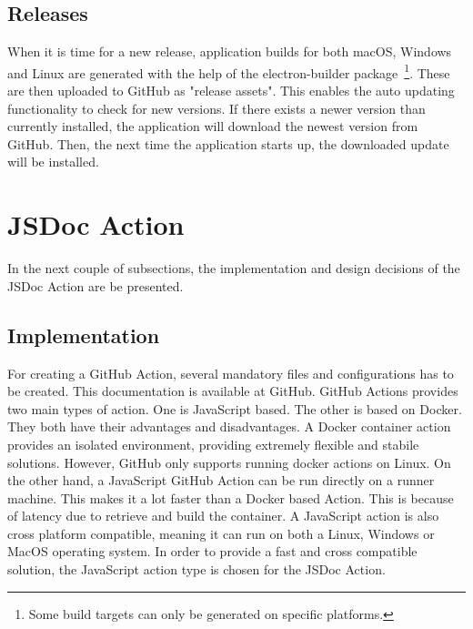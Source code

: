 \subsection{Releases}
When it is time for a new release, application builds for both macOS, Windows and Linux are generated with the help of the electron-builder package~\footnote{Some build targets can only be generated on specific platforms.}. These are then uploaded to GitHub as "release assets".
This enables the auto updating functionality to check for new versions. If there exists a newer version than currently installed, the application will download the newest version from GitHub. Then, the next time the application starts up, the downloaded update will be installed.

\section{JSDoc Action}
In the next couple of subsections, the implementation and design decisions of the JSDoc Action are be presented.
\subsection{Implementation}
For creating a GitHub Action, several mandatory files and configurations has to be created. This documentation is available at GitHub. GitHub Actions provides two main types of action. One is JavaScript based. The other is based on Docker. They both have their advantages and disadvantages. A Docker container action provides an isolated environment, providing extremely flexible and stabile solutions. However, GitHub only supports running docker actions on Linux. On the other hand, a JavaScript GitHub Action can be run directly on a runner machine. This makes it a lot faster than a Docker based Action. This is because of latency due to retrieve and build the container. A JavaScript action is also cross platform compatible, meaning it can run on both a Linux, Windows or MacOS operating system. In order to provide a fast and cross compatible solution, the JavaScript action type is chosen for the JSDoc Action.


